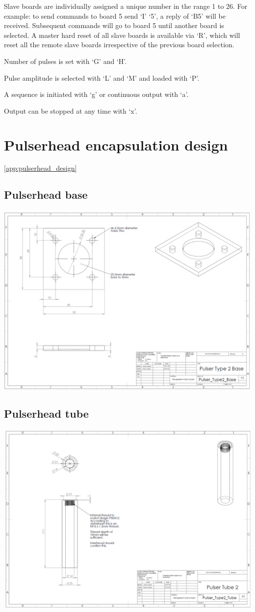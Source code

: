 Slave boards are individually assigned a unique number in the range 1 to 26. For example: to send commands to board 5 send ‘I’ ‘5’, a reply of ‘B5’ will be received. Subsequent commands will go to board 5 until another board is selected. A master hard reset of all slave boards is available via ‘R’, which will reset all the remote slave boards irrespective of the previous board selection.

Number of pulses is set with ‘G’ and ‘H’.

Pulse amplitude is selected with ‘L’ and  ‘M’ and loaded with ‘P’.

A sequence is initiated with ‘g’ or  continuous output with ‘a’.               

Output can be stopped at any time with ‘x’.
%
%
\section{Pulserhead encapsulation design}
\ref{app:pulserhead_design}
\subsection*{Pulserhead base}
\includegraphics[width=\linewidth]{figures/pulserhead_base.png}
\subsection*{Pulserhead tube}
\includegraphics[width=\linewidth]{figures/pulserhead_tube.png}
